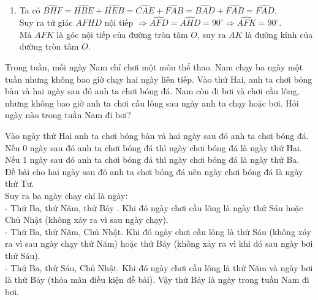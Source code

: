 \begin{ex}
{\begin{enumerate}
   	    	\begin{center}
 \end{center}
   	\item Ta có $\widehat{BHF}= \widehat{HBE}+ \widehat{HEB}= \widehat{CAE}+ \widehat{FAB}= \widehat{BAD}+ \widehat{FAB}= \widehat{FAD}$.\\
   	Suy ra tứ giác $AFHD$ nội tiếp $\Rightarrow \widehat{AFD}= \widehat{AHD}= 90^\circ \Rightarrow \widehat{AFK}= 90^\circ$.\\
   	Mà $\widehat{AFK}$ là góc nội tiếp của đường tròn tâm $O$, suy ra $AK$ là đường kính của đường tròn tâm $O$.
   	
   \end{enumerate}
    }
\end{ex}

\begin{ex}%
	Trong tuần, mỗi ngày Nam chỉ chơi một môn thể thao. Nam chạy ba ngày một tuần nhưng không bao giờ chạy hai ngày liên tiếp. Vào thứ Hai, anh ta chơi bóng bàn và hai ngày sau đó anh ta chơi bóng đá. Nam còn đi bơi và chơi cầu lông, nhưng không bao giờ anh ta chơi cầu lông sau ngày anh ta chạy hoặc bơi. Hỏi ngày nào trong tuần Nam đi bơi?
	
	\loigiai
	{
	Vào ngày thứ Hai anh ta chơi bóng bàn và hai ngày sau đó anh ta chơi bóng đá.\\
	Nếu $0$ ngày sau đó anh ta chơi bóng đá thì ngày chơi bóng đá là ngày thứ Hai.\\
	Nếu $1$ ngày sau đó anh ta chơi bóng đá thì ngày chơi bóng đá là ngày thứ Ba.\\
	Đề bài cho hai ngày sau đó anh ta chơi bóng đá nên ngày chơi bóng đá là ngày thứ Tư.\\
	Suy ra ba ngày chạy chỉ là ngày:\\
	- Thứ Ba, thứ Năm, thứ Bảy . Khi đó ngày chơi cầu lông là ngày thứ Sáu hoặc Chủ Nhật (không xảy ra vì sau ngày chạy).\\
	- Thứ Ba, thứ Năm, Chủ Nhật. Khi đó ngày chơi cầu lông là thứ Sáu (không xảy ra vì sau ngày chạy thứ Năm) hoặc thứ Bảy (không xảy ra vì khi đó sau ngày bơi thứ Sáu).\\
	- Thứ Ba, thứ Sáu, Chủ Nhật. Khi đó ngày chơi cầu lông là thứ Năm và ngày bơi là thứ Bảy (thỏa mãn điều kiện đề bài). Vậy thứ Bảy là ngày trong tuần Nam đi bơi.
	}
\end{ex}
